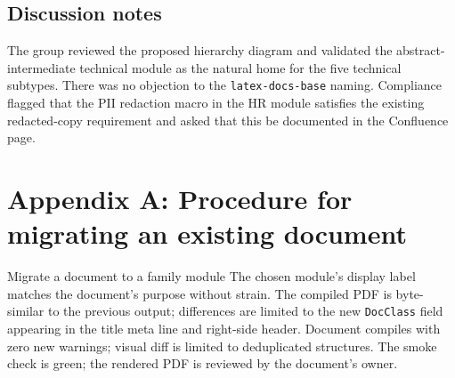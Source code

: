 \documentclass[11pt]{article}
\begin{document}
\subsection*{Discussion notes}

The group reviewed the proposed hierarchy diagram and validated the
abstract-intermediate technical module as the natural home for the five
technical subtypes. There was no objection to the
\texttt{latex-docs-base} naming. Compliance flagged that the PII
redaction macro in the HR module satisfies the existing redacted-copy
requirement and asked that this be documented in the Confluence page.

\section*{Appendix A: Procedure for migrating an existing document}

\begin{procedure}{Migrate a document to a family module}
        {The chosen module's display label matches the document's
         purpose without strain.}
        {The compiled PDF is byte-similar to the previous output;
         differences are limited to the new \texttt{DocClass} field
         appearing in the title meta line and right-side header.}
        {Document compiles with zero new warnings; visual diff is limited
         to deduplicated structures.}
        {The smoke check is green; the rendered PDF is reviewed by the
         document's owner.}
\end{procedure}
\end{document}
